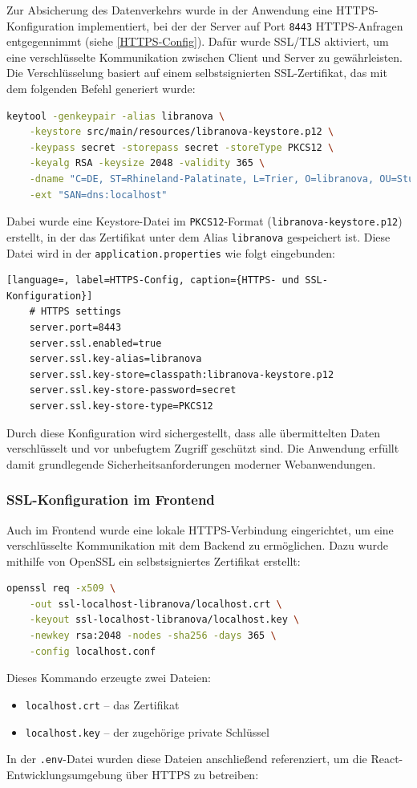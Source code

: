 Zur Absicherung des Datenverkehrs wurde in der Anwendung eine HTTPS-Konfiguration implementiert, bei der der Server auf Port \texttt{8443} HTTPS-Anfragen entgegennimmt (siehe \ref{HTTPS-Config}). Dafür wurde SSL/TLS aktiviert, um eine verschlüsselte Kommunikation zwischen Client und Server zu gewährleisten. \\
Die Verschlüsselung basiert auf einem selbstsignierten SSL-Zertifikat, das mit dem folgenden Befehl generiert wurde:
\begin{lstlisting}[language=bash, caption={Generierung eines SSL-Zertifikats}, breaklines=true]
	keytool -genkeypair -alias libranova \
	-keystore src/main/resources/libranova-keystore.p12 \
	-keypass secret -storepass secret -storeType PKCS12 \
	-keyalg RSA -keysize 2048 -validity 365 \
	-dname "C=DE, ST=Rhineland-Palatinate, L=Trier, O=libranova, OU=Studies Backend, CN=localhost" \
	-ext "SAN=dns:localhost"
\end{lstlisting}
Dabei wurde eine Keystore-Datei im \texttt{PKCS12}-Format (\texttt{libranova-keystore.p12}) erstellt, in der das Zertifikat unter dem Alias \texttt{libranova} gespeichert ist. Diese Datei wird in der \texttt{application.properties} wie folgt eingebunden:

\begin{lstlisting}[language=, label=HTTPS-Config, caption={HTTPS- und SSL-Konfiguration}]
	# HTTPS settings
	server.port=8443
	server.ssl.enabled=true
	server.ssl.key-alias=libranova
	server.ssl.key-store=classpath:libranova-keystore.p12
	server.ssl.key-store-password=secret
	server.ssl.key-store-type=PKCS12
\end{lstlisting}
Durch diese Konfiguration wird sichergestellt, dass alle übermittelten Daten verschlüsselt und vor unbefugtem Zugriff geschützt sind. Die Anwendung erfüllt damit grundlegende Sicherheitsanforderungen moderner Webanwendungen.


\subsubsection{SSL-Konfiguration im Frontend}

Auch im Frontend wurde eine lokale HTTPS-Verbindung eingerichtet, um eine verschlüsselte Kommunikation mit dem Backend zu ermöglichen. Dazu wurde mithilfe von OpenSSL ein selbstsigniertes Zertifikat erstellt:

\begin{lstlisting}[language=bash, caption={Generierung eines Frontend-Zertifikats}]
	openssl req -x509 \
	-out ssl-localhost-libranova/localhost.crt \
	-keyout ssl-localhost-libranova/localhost.key \
	-newkey rsa:2048 -nodes -sha256 -days 365 \
	-config localhost.conf
\end{lstlisting}
Dieses Kommando erzeugte zwei Dateien:
\begin{itemize}
	\item \texttt{localhost.crt} – das Zertifikat
	\item \texttt{localhost.key} – der zugehörige private Schlüssel
\end{itemize}
In der \texttt{.env}-Datei wurden diese Dateien anschließend referenziert, um die React-Entwicklungsumgebung über HTTPS zu betreiben:

